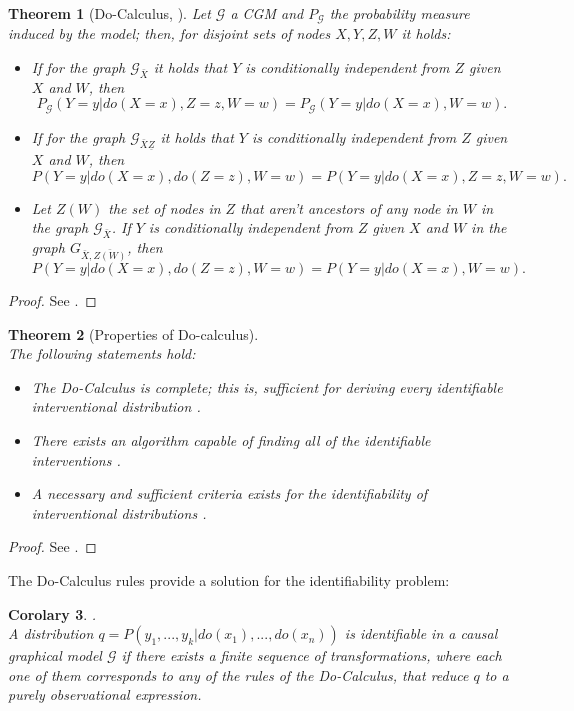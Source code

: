 \documentclass[review]{elsarticle}
\newtheorem{theorem}{Theorem}
\newtheorem{corollary}[theorem]{Corolary}
\begin{document}
\begin{theorem}[Do-Calculus, \cite{pearl2009causality}]{\label{docalculus}}
Let $\mathcal{G}$ a CGM and $P_{\mathcal{G}}$ the probability measure induced by the model; then, for disjoint sets of nodes $X,Y,Z,W$ it holds:
\begin{itemize}
\item If for the graph $\mathcal{G}_{\bar{X}}$ it holds that $Y$ is conditionally independent from  $Z$ given $X$ and $W$, then
\[ P_{\mathcal{G}}(Y=y | do(X=x), Z=z, W=w) = P_{\mathcal{G}}(Y=y | do(X=x), W=w). \]
\item If for the graph $\mathcal{G}_{\bar{X}\underline{Z}}$ it holds that $Y$ is conditionally independent from $Z$ given $X$ and $W$, then
\[ P(Y=y | do(X=x), do(Z=z), W=w) = P(Y=y | do(X=x), Z = z, W=w). \]
\item Let $Z(W)$ the set of nodes in  $Z$ that aren't ancestors of any node in  $W$ in the graph $\mathcal{G}_{\bar{X}}$.  If $Y$ is conditionally independent from $Z$ given $X$ and $W$ in the graph $G_{\bar{X}, \bar{Z(W)}}$, then
\[ P(Y=y | do(X=x), do(Z=z), W=w) = P(Y=y | do(X=x), W=w). \]
\end{itemize}
\end{theorem}
\begin{proof}
See \cite{pearl2009causality}.
\end{proof}
\begin{theorem}[Properties of Do-calculus]{\cite{peters2017elements}}\\
The following statements hold:
\begin{itemize}
\item The Do-Calculus is complete; this is, sufficient for deriving every identifiable interventional distribution \citep{huang2006pearl,shpitser2006identification}.
\item There exists an algorithm capable of finding all of the identifiable interventions \citep{tian2002,huang2006pearl}.
\item A necessary and sufficient criteria exists for the identifiability of interventional distributions \citep{shpitser2006identification,huang2006pearl}.
\end{itemize}
\end{theorem}
\begin{proof}
See \cite{peters2017elements}.
\end{proof}
The Do-Calculus rules provide a solution for the identifiability problem:
\begin{corollary} \cite{pearl2009causality}.\\
A distribution $q=P(y_1,...,y_k | do(x_1),...,do(x_n))$ is identifiable in a causal graphical model $\mathcal{G}$ if there exists a finite sequence of transformations, where each one of them corresponds to any of the rules of the Do-Calculus, that reduce $q$ to a purely observational expression.
\end{corollary}
\end{document}
